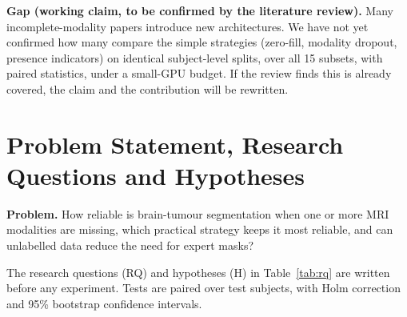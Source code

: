 \documentclass[11pt,a4paper]{article}
\begin{document}
\textbf{Gap (working claim, to be confirmed by the literature review).} Many incomplete-modality papers introduce new architectures. We have not yet confirmed how many compare the simple strategies (zero-fill, modality dropout, presence indicators) on identical subject-level splits, over all 15 subsets, with paired statistics, under a small-GPU budget. If the review finds this is already covered, the claim and the contribution will be rewritten.

\section{Problem Statement, Research Questions and Hypotheses}
\textbf{Problem.} How reliable is brain-tumour segmentation when one or more MRI modalities are missing, which practical strategy keeps it most reliable, and can unlabelled data reduce the need for expert masks?

The research questions (RQ) and hypotheses (H) in Table~\ref{tab:rq} are written before any experiment. Tests are paired over test subjects, with Holm correction and 95\% bootstrap confidence intervals.
\end{document}

